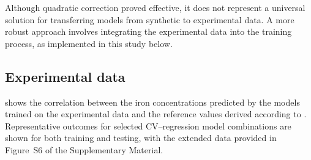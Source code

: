 \documentclass[10pt]{iopart}
\begin{document}
Although quadratic correction proved effective, it does not represent a universal solution
for transferring models from synthetic to experimental data.
A more robust approach involves integrating the experimental data into the training process, as implemented in this study below.



\subsection{Experimental data}

 shows the correlation between the iron concentrations predicted by the models trained on the experimental data
and the reference values derived according to \cite{Olikh2022:JMatSci,Olikh2021JAP}.
Representative outcomes for selected CV–regression model combinations are shown for both training and testing,
with the extended data provided in Figure~S6 of the Supplementary Material.
\end{document}
